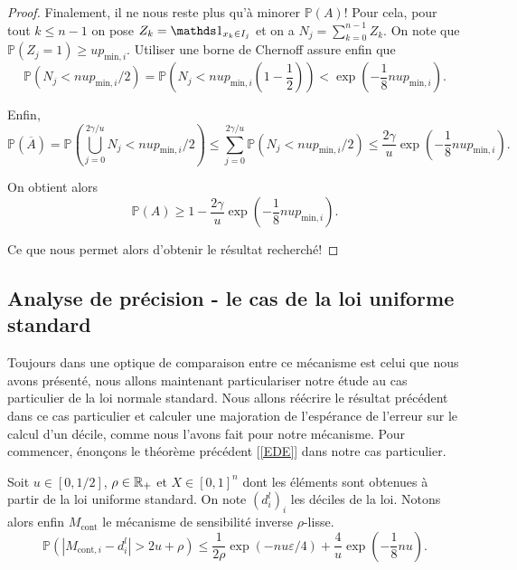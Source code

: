 \begin{proof}
    Finalement, il ne nous reste plus qu'à minorer \(\mathbb P (A)\)! Pour cela, pour tout \(k \leq n - 1\) on pose \(Z_k = \un_{x_k \in I_j}\) et on a \(N_j = \sum_{k = 0}^{n-1} Z_k\). On note que \(\mathbb P (Z_j = 1) \geq u p_{\text{min}, i}\). Utiliser une borne de {\sc Chernoff} \cite{10.5555/3134214} assure enfin que 
    \[
        \mathbb P \left( N_j < n u p_{\text{min}, i}/2\right) = \mathbb P \left( N_j < n u p_{\text{min}, i} \left( 1 - \dfrac{1}{2} \right)\right) < \exp\left( - \dfrac{1}{8}n u p_{\text{min}, i} \right).
    \]

    Enfin,
    \[
    \mathbb P \left( \overline A \right)  = \mathbb P \left( \bigcup_{j = 0}^{2\gamma /u} N_j < n u p_{\text{min}, i}/2  \right) \leq \sum_{j = 0}^{2\gamma/u} \mathbb P \left( N_j < n u p_{\text{min}, i}/2 \right) \leq \dfrac{2\gamma}{u}\exp\left( - \dfrac{1}{8}n u p_{\text{min}, i} \right).
    \]


    On obtient alors 
    \[
        \mathbb P (A) \geq 1 - \dfrac{2\gamma}{u}\exp\left( - \dfrac{1}{8}n u p_{\text{min}, i} \right).
    \]

    Ce que nous permet alors d'obtenir le résultat recherché!
\end{proof}

\subsection{Analyse de précision - le cas de la loi uniforme standard}

Toujours dans une optique de comparaison entre ce mécanisme est celui que nous avons présenté, nous allons maintenant particulariser notre étude au cas particulier de la loi normale standard. Nous allons réécrire le résultat précédent dans ce cas particulier et calculer une majoration de l’espérance de l'erreur sur le calcul d'un décile, comme nous l'avons fait pour notre mécanisme. Pour commencer, énonçons le théorème précédent [\ref{EDE}] dans notre cas particulier.

\begin{theorem}
    \label{EDE}
    Soit \(u \in [0, 1/2]\), \(\rho \in \mathbb{R}_+\) et \(X \in [0,1]^n\) dont les éléments sont obtenues à partir de la loi uniforme standard. On note \((d_i^l)_i\) les déciles de la loi. Notons alors enfin \(M_{\text{cont}}\) le mécanisme de sensibilité inverse \(\rho\)-lisse.
    \[
        \mathbb P\left( |M_{\text{cont}, i} - d_i^l| > 2u + \rho \right) \leq  \dfrac{1}{2\rho}\exp\left( -{nu\varepsilon}/{4} \right) + \dfrac{4}{u}\exp\left( - \dfrac{1}{8}n u \right).
    \]
\end{theorem}


